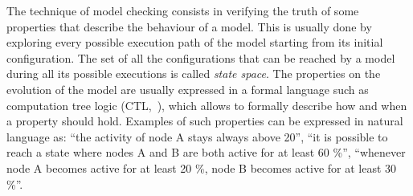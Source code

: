 \documentclass{bmcart}
\begin{document}
The technique of model checking consists in verifying the truth of some properties
that describe the behaviour of a model. This is usually done by exploring every
possible execution path of the model starting from its initial configuration. The set of all
the configurations that can be reached by a model during all its possible executions
is called \emph{state space}. The properties on the evolution of the model are
usually expressed in a formal language such as computation tree logic (CTL,~\cite{ctl}),
which allows to formally describe how and when a property should hold. Examples of such
properties can be expressed in natural language as: ``the activity of node A
stays always above 20'', ``it is possible to reach a state where nodes A and B are both
active for at least 60 \%'', ``whenever node A becomes active for at least 20 \%, node
B becomes active for at least 30 \%''.
\end{document}
